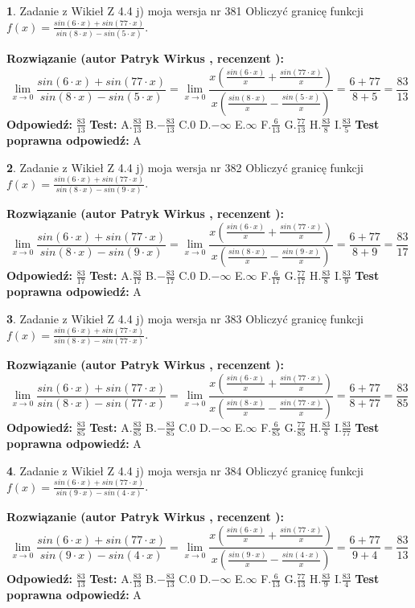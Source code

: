 \documentclass[12pt, a4paper]{article}
\theoremstyle{definition} %
\newtheorem{zad}{}
\newcommand{\zadStart}[1]{\begin{zad}#1\newline}
\newcommand{\zadStop}{\end{zad}}
\newcommand{\rozwStart}[2]{\noindent \textbf{Rozwiązanie (autor #1 , recenzent #2): }\newline}
\newcommand{\rozwStop}{\newline}
\newcommand{\odpStart}{\noindent \textbf{Odpowiedź:}\newline}
\newcommand{\odpStop}{\newline}
\newcommand{\testStart}{\noindent \textbf{Test:}\newline}
\newcommand{\testStop}{\newline}
\newcommand{\kluczStart}{\noindent \textbf{Test poprawna odpowiedź:}\newline}
\newcommand{\kluczStop}{\newline}
\begin{document}
\zadStart{Zadanie z Wikieł Z 4.4 j) moja wersja nr 381}
Obliczyć granicę funkcji $f(x)=\frac{sin(6\cdot x) +sin(77\cdot x)}{sin(8\cdot x) -sin(5\cdot x)}$.
\zadStop
\rozwStart{Patryk Wirkus}{}
$$\lim\limits_{x\to 0}\frac{sin(6\cdot x) +sin(77\cdot x)}{sin(8\cdot x) -sin(5\cdot x)}=\lim\limits_{x\to 0}\frac{x(\frac{sin(6\cdot x)}{x}+\frac{sin(77\cdot x)}{x})}{x(\frac{sin(8\cdot x)}{x}-\frac{sin(5\cdot x)}{x})}=\frac{6+77}{8+5} = \frac{83}{13}$$
\rozwStop
\odpStart
$\frac{83}{13}$
\odpStop
\testStart
A.$\frac{83}{13}$
B.$-\frac{83}{13}$
C.$0$
D.$-\infty$
E.$\infty$
F.$\frac{6}{13}$
G.$\frac{77}{13}$
H.$\frac{83}{8}$
I.$\frac{83}{5}$
\testStop
\kluczStart
A
\kluczStop



\zadStart{Zadanie z Wikieł Z 4.4 j) moja wersja nr 382}
Obliczyć granicę funkcji $f(x)=\frac{sin(6\cdot x) +sin(77\cdot x)}{sin(8\cdot x) -sin(9\cdot x)}$.
\zadStop
\rozwStart{Patryk Wirkus}{}
$$\lim\limits_{x\to 0}\frac{sin(6\cdot x) +sin(77\cdot x)}{sin(8\cdot x) -sin(9\cdot x)}=\lim\limits_{x\to 0}\frac{x(\frac{sin(6\cdot x)}{x}+\frac{sin(77\cdot x)}{x})}{x(\frac{sin(8\cdot x)}{x}-\frac{sin(9\cdot x)}{x})}=\frac{6+77}{8+9} = \frac{83}{17}$$
\rozwStop
\odpStart
$\frac{83}{17}$
\odpStop
\testStart
A.$\frac{83}{17}$
B.$-\frac{83}{17}$
C.$0$
D.$-\infty$
E.$\infty$
F.$\frac{6}{17}$
G.$\frac{77}{17}$
H.$\frac{83}{8}$
I.$\frac{83}{9}$
\testStop
\kluczStart
A
\kluczStop



\zadStart{Zadanie z Wikieł Z 4.4 j) moja wersja nr 383}
Obliczyć granicę funkcji $f(x)=\frac{sin(6\cdot x) +sin(77\cdot x)}{sin(8\cdot x) -sin(77\cdot x)}$.
\zadStop
\rozwStart{Patryk Wirkus}{}
$$\lim\limits_{x\to 0}\frac{sin(6\cdot x) +sin(77\cdot x)}{sin(8\cdot x) -sin(77\cdot x)}=\lim\limits_{x\to 0}\frac{x(\frac{sin(6\cdot x)}{x}+\frac{sin(77\cdot x)}{x})}{x(\frac{sin(8\cdot x)}{x}-\frac{sin(77\cdot x)}{x})}=\frac{6+77}{8+77} = \frac{83}{85}$$
\rozwStop
\odpStart
$\frac{83}{85}$
\odpStop
\testStart
A.$\frac{83}{85}$
B.$-\frac{83}{85}$
C.$0$
D.$-\infty$
E.$\infty$
F.$\frac{6}{85}$
G.$\frac{77}{85}$
H.$\frac{83}{8}$
I.$\frac{83}{77}$
\testStop
\kluczStart
A
\kluczStop



\zadStart{Zadanie z Wikieł Z 4.4 j) moja wersja nr 384}
Obliczyć granicę funkcji $f(x)=\frac{sin(6\cdot x) +sin(77\cdot x)}{sin(9\cdot x) -sin(4\cdot x)}$.
\zadStop
\rozwStart{Patryk Wirkus}{}
$$\lim\limits_{x\to 0}\frac{sin(6\cdot x) +sin(77\cdot x)}{sin(9\cdot x) -sin(4\cdot x)}=\lim\limits_{x\to 0}\frac{x(\frac{sin(6\cdot x)}{x}+\frac{sin(77\cdot x)}{x})}{x(\frac{sin(9\cdot x)}{x}-\frac{sin(4\cdot x)}{x})}=\frac{6+77}{9+4} = \frac{83}{13}$$
\rozwStop
\odpStart
$\frac{83}{13}$
\odpStop
\testStart
A.$\frac{83}{13}$
B.$-\frac{83}{13}$
C.$0$
D.$-\infty$
E.$\infty$
F.$\frac{6}{13}$
G.$\frac{77}{13}$
H.$\frac{83}{9}$
I.$\frac{83}{4}$
\testStop
\kluczStart
A
\kluczStop
\end{document}
